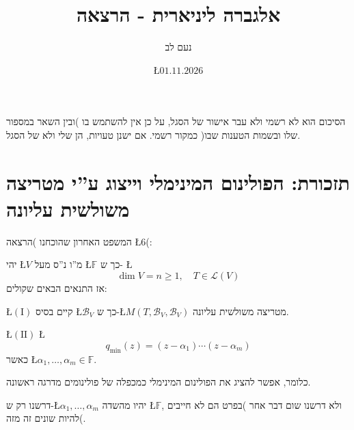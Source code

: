 \documentclass[english,hebrew]{article}
\begin{document}
\title{אלגברה ליניארית {\endL} - הרצאה {\endL}}
\author{נעם לב}
\date{\L{$01.11.2026$}}

\maketitle
\noindent{}
\begin{center}
הסיכום הוא לא רשמי ולא עבר אישור של הסגל, על כן אין להשתמש בו )ובין
השאר במספור שלו ובשמות הטענות שבו( כמקור רשמי. אם ישנן טעויות, הן
שלי ולא של הסגל.
\par\end{center}

\medskip{}

\tableofcontents{}

\newpage{}

\section{תזכורת: הפולינום המינימלי וייצוג ע\textquotedblright י מטריצה משולשית
עליונה}

המשפט האחרון שהוכחנו )הרצאה \L{$6$}(:

יהי \L{$V$} מ\textquotedblright ו נ\textquotedblright ס מעל \L{$\mathbb{F}$}
כך ש- \L{%
\[
\dim V=n\ge1,\quad T\in\mathcal{L}(V)
\]
}%
אז התנאים הבאים שקולים:

\L{$(\text{I})$} קיים בסיס \L{$\mathcal{B}_{V}$} כך ש-\L{$M(T,\mathcal{B}_{V},\mathcal{B}_{V})$}
מטריצה משולשית עליונה.

\L{$(\text{II})$} \L{%
\[
q_{\min}(z)=(z-\alpha_{1})\cdots(z-\alpha_{m})
\]
}%
כאשר \L{$\alpha_{1},\dots,\alpha_{m}\in\mathbb{F}$}.

כלומר, אפשר להציג את הפולינום המינימלי כמכפלה של פולינומים מדרגה ראשונה.

דרשנו רק ש-\L{$\alpha_{1},\dots,\alpha_{m}$} יהיו מהשדה \L{$\mathbb{F}$},
ולא דרשנו שום דבר אחר )בפרט הם לא חייבים להיות שונים זה מזה(.
\end{document}
